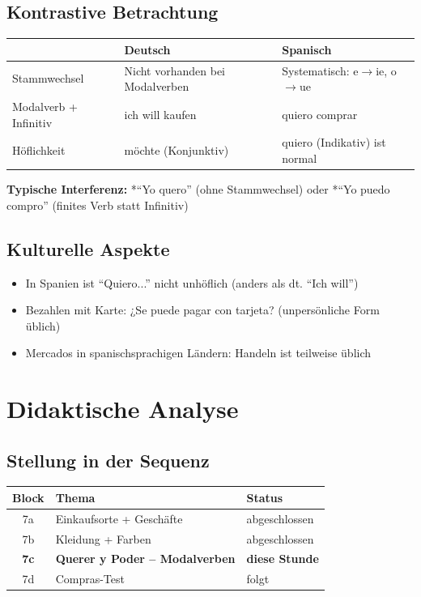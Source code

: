 \documentclass[11pt,a4paper]{article}
\begin{document}
\subsection{Kontrastive Betrachtung}

\begin{tabular}{|l|p{5cm}|p{5cm}|}
\hline
& \textbf{Deutsch} & \textbf{Spanisch} \\
\hline
Stammwechsel & Nicht vorhanden bei Modalverben & Systematisch: e$\rightarrow$ie, o$\rightarrow$ue \\
\hline
Modalverb + Infinitiv & ich will kaufen & quiero comprar \\
\hline
Höflichkeit & möchte (Konjunktiv) & quiero (Indikativ) ist normal \\
\hline
\end{tabular}

\textbf{Typische Interferenz:} *``Yo quero'' (ohne Stammwechsel) oder *``Yo puedo compro'' (finites Verb statt Infinitiv)

\subsection{Kulturelle Aspekte}
\begin{itemize}
    \item In Spanien ist ``Quiero...'' nicht unhöflich (anders als dt. ``Ich will'')
    \item Bezahlen mit Karte: ¿Se puede pagar con tarjeta? (unpersönliche Form üblich)
    \item Mercados in spanischsprachigen Ländern: Handeln ist teilweise üblich
\end{itemize}

\section{Didaktische Analyse}

\subsection{Stellung in der Sequenz}
\begin{tabular}{|c|l|l|}
\hline
\textbf{Block} & \textbf{Thema} & \textbf{Status} \\
\hline
7a & Einkaufsorte + Geschäfte & abgeschlossen \\
7b & Kleidung + Farben & abgeschlossen \\
\textbf{7c} & \textbf{Querer y Poder -- Modalverben} & \textbf{diese Stunde} \\
7d & Compras-Test & folgt \\
\hline
\end{tabular}
\end{document}
